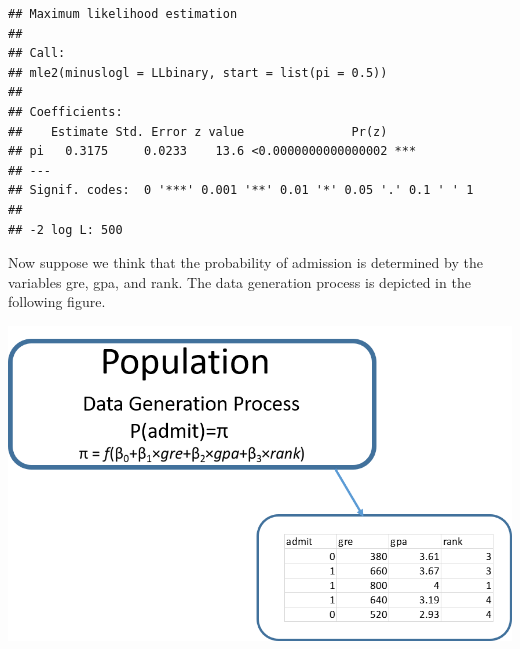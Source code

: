\documentclass[
]{article}
\newenvironment{Shaded}{\begin{snugshade}}{\end{snugshade}}
\newcommand{\AttributeTok}[1]{\textcolor[rgb]{0.77,0.63,0.00}{#1}}
\newcommand{\ControlFlowTok}[1]{\textcolor[rgb]{0.13,0.29,0.53}{\textbf{#1}}}
\newcommand{\DecValTok}[1]{\textcolor[rgb]{0.00,0.00,0.81}{#1}}
\newcommand{\FunctionTok}[1]{\textcolor[rgb]{0.00,0.00,0.00}{#1}}
\newcommand{\NormalTok}[1]{#1}
\newcommand{\OtherTok}[1]{\textcolor[rgb]{0.56,0.35,0.01}{#1}}
\newcommand{\SpecialCharTok}[1]{\textcolor[rgb]{0.00,0.00,0.00}{#1}}
\newcommand{\StringTok}[1]{\textcolor[rgb]{0.31,0.60,0.02}{#1}}
\begin{document}
\begin{Shaded}
\end{Shaded}

\begin{verbatim}
## Maximum likelihood estimation
## 
## Call:
## mle2(minuslogl = LLbinary, start = list(pi = 0.5))
## 
## Coefficients:
##    Estimate Std. Error z value               Pr(z)    
## pi   0.3175     0.0233    13.6 <0.0000000000000002 ***
## ---
## Signif. codes:  0 '***' 0.001 '**' 0.01 '*' 0.05 '.' 0.1 ' ' 1
## 
## -2 log L: 500
\end{verbatim}

Now suppose we think that the probability of admission is determined by
the variables gre, gpa, and rank. The data generation process is
depicted in the following figure.

\includegraphics{estpic12.png}
\end{document}
